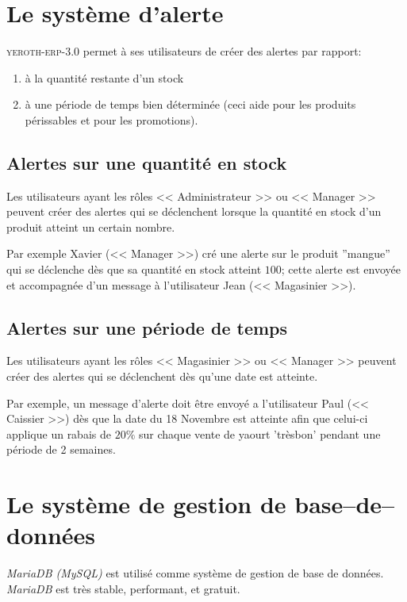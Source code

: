 \documentclass[a4paper, 10pt, twocolumn]{article}
\newcommand{\yeren}{\textsc{yeroth-erp-3.0}\xspace}
\newcommand{\manager}{<< Manager >>\xspace}
\newcommand{\caissier}{<< Caissier >>\xspace}
\newcommand{\administrateur}{<< Administrateur >>\xspace}
\newcommand{\magasinier}{<< Magasinier >>\xspace}
\begin{document}
\vspace{-1em}
\section{Le syst\`eme d'alerte}
\vspace{-0.5em}
\yeren permet \`a ses utilisateurs de cr\'eer
des alertes par rapport:
\begin{enumerate}[1)]
	\itemsep -0.5em
	\item \`a la quantit\'e restante d'un stock
	\item \`a une p\'eriode de temps bien
		d\'etermin\'ee (ceci aide pour les
		produits p\'erissables et pour les promotions).
\end{enumerate}

\vspace{-1em}

\subsection{Alertes sur une quantit\'e en stock}
\vspace{-0.1em}
Les utilisateurs ayant les r\^oles \administrateur ou
\manager peuvent cr\'eer des alertes qui se
d\'eclenchent lorsque la quantit\'e en stock d'un produit
atteint un certain nombre.

Par exemple Xavier (\manager) cr\'e une alerte sur le
produit ''mangue'' qui se d\'eclenche d\`es que sa quantit\'e
en stock atteint $100$; cette alerte est envoy\'ee et
accompagn\'ee d'un message \`a l'utilisateur Jean (\magasinier).

\vspace{-1em}

\subsection{Alertes sur une p\'eriode de temps}
\vspace{-0.1em}
Les utilisateurs ayant les r\^oles \magasinier ou
\manager peuvent cr\'eer des alertes qui se
d\'eclenchent d\`es qu'une date est atteinte.

Par exemple, un message d'alerte doit \^etre envoy\'e
a l'utilisateur Paul (\caissier) d\`es que
la date du 18 Novembre est atteinte afin que celui-ci
applique un rabais de $20\%$ sur chaque vente de
yaourt 'tr\`esbon' pendant une p\'eriode de 2 semaines.

\vspace{-1.1em}
\section{Le syst\`eme de gestion de base--de--donn\'ees}
\vspace{-0.9em}
\emph{MariaDB (MySQL)} est utilis\'e comme syst\`eme de gestion
de base de donn\'ees. \emph{MariaDB} est tr\`es stable,
performant, et gratuit.
\end{document}
